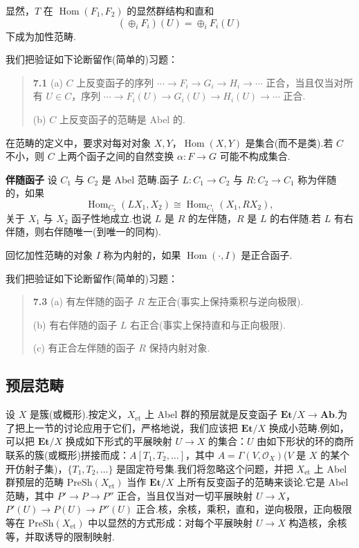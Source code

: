 显然，$T$ 在 $\operatorname{Hom}(F_1, F_2)$ 的显然群结构和直和
\[
(\oplus_i F_i)(U) = \oplus_i F_i(U)
\]
下成为加性范畴.

我们把验证如下论断留作(简单的)习题：

\begin{quote}
\label{item:7.1}
\textbf{7.1} (a) $C$ 上反变函子的序列 $\cdots \to F_i \to G_i \to H_i \to \cdots$ 正合，当且仅当对所有 $U \in C$，序列 $\cdots \to F_i(U) \to G_i(U) \to H_i(U) \to \cdots$ 正合.

(b) $C$ 上反变函子的范畴是 Abel 的.
\end{quote}

\begin{remark}\label{rem:7.2}
在范畴的定义中，要求对每对对象 $X, Y$，$\operatorname{Hom}(X, Y)$ 是集合(而不是类).若 $C$ 不小，则 $C$ 上两个函子之间的自然变换 $\alpha \colon F \to G$ 可能不构成集合.
\end{remark}

\textbf{伴随函子} 设 $C_1$ 与 $C_2$ 是 Abel 范畴.函子 $L \colon C_1 \to C_2$ 与 $R \colon C_2 \to C_1$ 称为伴随的，如果
\[
\operatorname{Hom}_{C_2}(LX_1, X_2) \cong \operatorname{Hom}_{C_1}(X_1, RX_2),
\]
关于 $X_1$ 与 $X_2$ 函子性地成立.也说 $L$ 是 $R$ 的左伴随，$R$ 是 $L$ 的右伴随.若 $L$ 有右伴随，则右伴随唯一(到唯一的同构).

回忆加性范畴的对象 $I$ 称为内射的，如果 $\operatorname{Hom}(\cdot, I)$ 是正合函子.

我们把验证如下论断留作(简单的)习题：

\begin{quote}
\label{item:7.3}
\textbf{7.3} (a) 有左伴随的函子 $R$ 左正合(事实上保持乘积与逆向极限).

(b) 有右伴随的函子 $L$ 右正合(事实上保持直和与正向极限).

(c) 有正合左伴随的函子 $R$ 保持内射对象.
\end{quote}

\subsection*{预层范畴}

设 $X$ 是簇(或概形).按定义，$X_{\mathrm{et}}$ 上 Abel 群的预层就是反变函子 $\mathbf{Et}/X \to \mathbf{Ab}$.为了把上一节的讨论应用于它们，严格地说，我们应该把 $\mathbf{Et}/X$ 换成小范畴.例如，可以把 $\mathbf{Et}/X$ 换成如下形式的平展映射 $U \to X$ 的集合：$U$ 由如下形状的环的商所联系的簇(或概形)拼接而成：$A[T_1, T_2, \ldots]$，其中 $A = \Gamma(V, \mathcal{O}_X)$($V$ 是 $X$ 的某个开仿射子集)，$\{T_1, T_2, \ldots\}$ 是固定符号集.我们将忽略这个问题，并把 $X_{\mathrm{et}}$ 上 Abel 群预层的范畴 $\mathrm{PreSh}(X_{\mathrm{et}})$ 当作 $\mathbf{Et}/X$ 上所有反变函子的范畴来谈论.它是 Abel 范畴，其中 $P' \to P \to P''$ 正合，当且仅当对一切平展映射 $U \to X$，$P'(U) \to P(U) \to P''(U)$ 正合.核，余核，乘积，直和，逆向极限，正向极限等在 $\mathrm{PreSh}(X_{\mathrm{et}})$ 中以显然的方式形成：对每个平展映射 $U \to X$ 构造核，余核等，并取诱导的限制映射.

